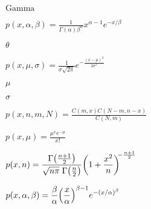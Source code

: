 \documentclass{article}
\begin{document}
$\mathrm{Gamma}$
\pagebreak

$\displaystyle p(x,\alpha,\beta) = \frac{1}{\Gamma(\alpha) \beta^\alpha} x^{\alpha-1} e^{-x / \beta} $
\pagebreak

$\theta$
\pagebreak

$\displaystyle p(x,\mu,\sigma) = \frac{1}{\sigma \sqrt{2\pi}} e^{-\frac{(x-\mu)^2}{2\sigma^2}} $
\pagebreak

$\mu$
\pagebreak

$\sigma$
\pagebreak

$\displaystyle p(x,n,m,N) = \frac{C(m,x) C(N-m, n-x)}{C(N,m)} $
\pagebreak

$\displaystyle p(x,\mu) = \frac{\mu^x e^{-\mu}}{x!} $
\pagebreak

$\displaystyle p(x,n) = \frac{\Gamma \paren*{ \frac{n+1}{2}} } {\sqrt{n\pi} \; \Gamma \paren*{ \frac{n}{2} }} \paren*{1 + \frac{x^2}{n}}^{\!\! -\frac{n+1}{2}} $
\pagebreak

$\displaystyle p(x,\alpha,\beta) = \frac{\beta}{\alpha} \paren*{ \frac{x}{\alpha} }^{\beta-1} e^{-(x/\alpha)^\beta} $
\pagebreak
\end{document}

